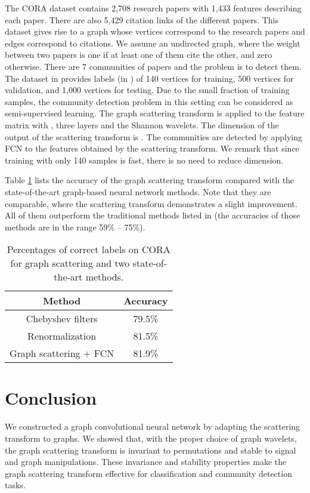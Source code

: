 \documentclass{article}
\begin{document}
The CORA dataset \cite{SenNB08} contains 2,708 research papers with 1,433 features describing each paper. There are also 5,429 citation links of the different papers. 
This dataset gives rise to a graph whose vertices correspond to the research papers and edges correspond to citations. We assume an undirected graph, where the weight between two papers is one if at least one of them cite the other, and zero otherwise. 
There are 7 communities of papers and the problem is to detect them. The dataset in \cite{SenNB08} provides labels {(in )} of 140 vertices for training, 500 vertices for validation, and 1,000 vertices for testing. Due to the small fraction of training samples, the community detection problem in this setting can be considered as semi-supervised learning. The graph scattering transform is applied to the  feature matrix with {,} three layers {and the Shannon wavelets. The dimension of the output of the scattering transform is .} The communities are detected by applying FCN to the features obtained by the scattering transform. {We remark that since training with only 140 samples is fast, there is no need to reduce dimension.}

Table \ref{tab:cora} lists the accuracy of the graph scattering transform compared with the state-of-the-art graph-based neural network methods. Note that they are comparable, where the scattering transform demonstrates a slight improvement. All of them outperform the traditional methods listed in \cite[Table 2]{KipW16} (the accuracies of those methods are in the range 59\% -- 75\%). 


\begin{table}[!ht]
\centering
\begin{tabular}{|c|c|}
\hline
Method & Accuracy \\
\hline
Chebyshev filters \cite{DefBV16,KipW16} & 79.5\% \\
\hline
Renormalization \cite{KipW16} & 81.5\% \\
\hline
Graph scattering + FCN &  81.9\%  \\
\hline
\end{tabular}
\caption{Percentages of correct labels on CORA for graph scattering and two state-of-the-art methods.}
\label{tab:cora}
\end{table}

\section{Conclusion}

{We constructed a graph convolutional neural network by adapting the scattering transform to graphs. We showed that, with the proper choice of graph wavelets, the graph scattering transform is invariant to permutations and stable to signal and graph manipulations. These invariance and stability properties make the graph scattering transform effective for classification and community detection tasks.}
\end{document}
